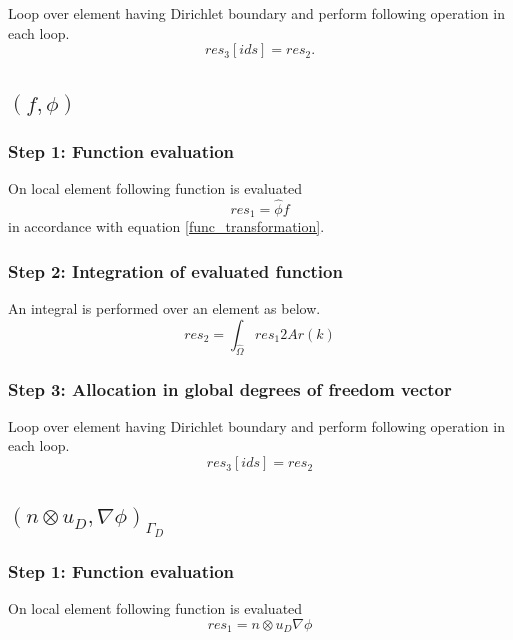 \documentclass[a4paper]{book}
\begin{document}
Loop over element having Dirichlet boundary and perform following operation in each loop.
\begin{equation}
res_3[ids]=res_2.
\end{equation}

\subsection{$(f,\phi) $}

\subsubsection{Step 1: Function evaluation}

On local element following function is evaluated 
\begin{equation}
res_1 = \hat{\phi} f
\end{equation} 
in accordance with equation \ref{func_transformation}.\\

\subsubsection{Step 2: Integration of evaluated function}
An integral is performed over an element as below.
\begin{equation}
res_2 = \int_{\hat{\Omega}} res_1 2 Ar(k)
\end{equation}

\subsubsection{Step 3: Allocation in global degrees of freedom vector}

Loop over element having Dirichlet boundary and perform following operation in each loop.
\begin{equation}
res_3[ids]=res_2
\end{equation}


\subsection{$(n \otimes u_D,\nabla \phi)_{\Gamma_D} $}

\subsubsection{Step 1: Function evaluation}

On local element following function is evaluated 
\begin{equation}
res_1 =  n \otimes u_D  \nabla \phi
\end{equation}
\end{document}
